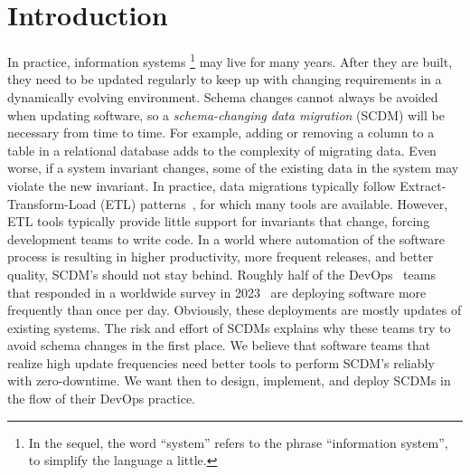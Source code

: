 \documentclass[runningheads]{llncs}
\def\define#1{\label{dfn:#1}{\em #1}\index{#1}}
\begin{document}
\section{Introduction}
\label{sct:Introduction}
   In practice, information systems%
   \footnote{In the sequel, the word ``system'' refers to the phrase ``information system'', to simplify the language a little.}
   may live for many years.
   After they are built, they need to be updated regularly to keep up with changing requirements in a dynamically evolving environment.
   Schema changes cannot always be avoided when updating software, so a \define{schema-changing data migration} (SCDM) will be necessary from time to time.
   For example, adding or removing a column to a table in a relational database adds to the complexity of migrating data.
   Even worse, if a system invariant changes, some of the existing data in the system may violate the new invariant.
   In practice, data migrations typically follow Extract-Transform-Load (ETL) patterns~\cite{Theodorou2017},
   for which many tools are available.
   However, ETL tools typically provide little support for invariants that change, forcing development teams to write code.
   In a world where automation of the software process is resulting in higher productivity, more frequent releases, and better quality,
   SCDM's should not stay behind.
   Roughly half of the DevOps~\cite{BassWeberZhu15} teams that responded in a worldwide survey in 2023~\cite{HumanitecDevOps2023} are deploying software more frequently than once per day.
   Obviously, these deployments are mostly updates of existing systems.
   The risk and effort of SCDMs explains why these teams try to avoid schema changes in the first place.
   We believe that software teams that realize high update frequencies need better tools to perform SCDM's reliably with zero-downtime.
   We want then to design, implement, and deploy SCDMs in the flow of their DevOps practice.
\end{document}
